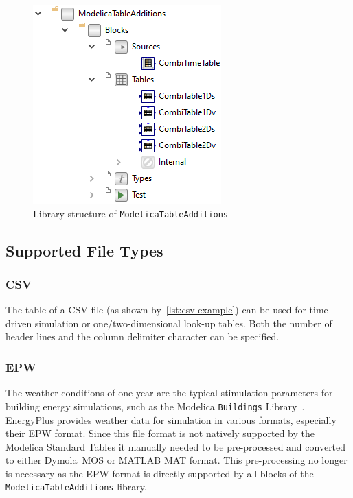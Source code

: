 \documentclass{modelica}
\newcommand{\modelica}[1]{\lstinline[language=modelica]|#1|}
\begin{document}
\begin{figure}[!ht]
\centering
\includegraphics[scale=0.8]{resources/ModelicaTableAdditions.png}
\caption{Library structure of \modelica{ModelicaTableAdditions}}
\label{fig:ModelicaTableAdditions}
\end{figure}

\subsection{Supported File Types}

\subsubsection{CSV}

The table of a CSV file (as shown by~\autoref{lst:csv-example}) can be used for time-driven simulation or one/two-dimensional look-up tables.
Both the number of header lines and the column delimiter character can be specified.

\subsubsection{EPW}

The weather conditions of one year are the typical stimulation parameters for building energy simulations, such as the Modelica \modelica{Buildings} Library~\cite{buildings}.
EnergyPlus provides weather data for simulation in various formats, especially their EPW format.
Since this file format is not natively supported by the Modelica Standard Tables it manually needed to be pre-processed and converted to either Dymola~MOS or MATLAB MAT format.
This pre-processing no longer is necessary as the EPW format is directly supported by all blocks of the \modelica{ModelicaTableAdditions} library.
\end{document}
